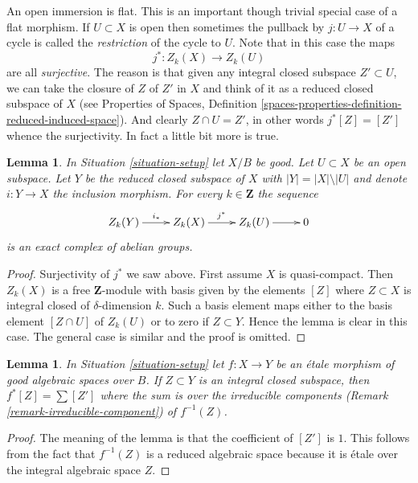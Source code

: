\documentclass{stacks-project}
\theoremstyle{plain}
\newtheorem{lemma}[subsection]{Lemma}
\theoremstyle{definition}
\theoremstyle{remark}
\numberwithin{equation}{subsection}
\begin{document}
\noindent
An open immersion is flat. This is an important though trivial special
case of a flat morphism. If $U \subset X$ is open then sometimes the
pullback by $j : U \to X$ of a cycle is called the {\it restriction} of the
cycle to $U$. Note that in this case the maps
$$
j^* : Z_k(X) \longrightarrow Z_k(U)
$$
are all {\it surjective}. The reason is that given any integral closed
subspace $Z' \subset U$, we can take the closure of $Z$ of $Z'$ in $X$
and think of it as a reduced closed subspace of $X$ (see
Properties of Spaces, Definition
\ref{spaces-properties-definition-reduced-induced-space}).
And clearly $Z \cap U = Z'$, in other words
$j^*[Z] = [Z']$ whence the surjectivity. In fact a little bit more
is true.

\begin{lemma}
\label{lemma-exact-sequence-open}
In Situation \ref{situation-setup} let $X/B$ be good.
Let $U \subset X$ be an open subspace. Let $Y$ be the
reduced closed subspace of $X$ with $|Y| = |X| \setminus |U|$
and denote $i : Y \to X$ the inclusion morphism.
For every $k \in \mathbf{Z}$ the sequence
$$
\xymatrix{
Z_k(Y) \ar[r]^{i_*} & Z_k(X) \ar[r]^{j^*} & Z_k(U) \ar[r] & 0
}
$$
is an exact complex of abelian groups.
\end{lemma}

\begin{proof}
Surjectivity of $j^*$ we saw above.
First assume $X$ is quasi-compact. Then $Z_k(X)$ is a free $\mathbf{Z}$-module
with basis given by the elements $[Z]$ where $Z \subset X$ is integral
closed of $\delta$-dimension $k$. Such a basis element maps
either to the basis element $[Z \cap U]$ of $Z_k(U)$
or to zero if $Z \subset Y$.
Hence the lemma is clear in this case. The general case is similar
and the proof is omitted.
\end{proof}

\begin{lemma}
\label{lemma-etale-pullback}
In Situation \ref{situation-setup} let $f : X \to Y$ be an \'etale
morphism of good algebraic spaces over $B$. If $Z \subset Y$ is an integral
closed subspace, then $f^*[Z] = \sum [Z']$ where the sum is over the
irreducible components (Remark \ref{remark-irreducible-component})
of $f^{-1}(Z)$.
\end{lemma}

\begin{proof}
The meaning of the lemma is that the coefficient of $[Z']$ is $1$.
This follows from the fact that $f^{-1}(Z)$ is a reduced algebraic space
because it is \'etale over the integral algebraic space $Z$.
\end{proof}
\end{document}
